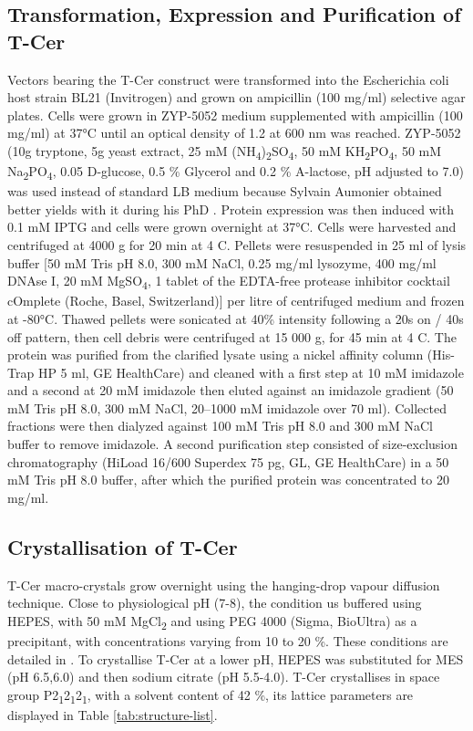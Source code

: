 \subsection{Transformation, Expression and Purification of T-Cer}
Vectors bearing the T-Cer construct were transformed into the Escherichia coli host strain BL21 (Invitrogen) and grown on ampicillin (100 mg/ml) selective agar plates. Cells were grown in ZYP-5052 medium supplemented with ampicillin (100 mg/ml) at 37°C until an optical density of 1.2 at 600 nm was reached. ZYP-5052 (10g tryptone, 5g yeast extract, 25 mM (NH\textsubscript{4})\textsubscript{2}SO\textsubscript{4}, 50 mM KH\textsubscript{2}PO\textsubscript{4}, 50 mM Na\textsubscript{2}PO\textsubscript{4}, 0.05 D-glucose, 0.5 \% Glycerol and 0.2 \% A-lactose, pH adjusted to 7.0) was used instead of standard LB medium because Sylvain Aumonier obtained better yields with it during his PhD \parencite{aumonierTimeresolvedMonochromaticSynchrotron2019}. Protein expression was then induced with 0.1 mM IPTG and cells were grown overnight at 37°C. Cells were harvested and centrifuged at 4000 g for 20 min at 4 \degree C. Pellets were resuspended in 25 ml of lysis buffer [50 mM Tris pH 8.0, 300 mM NaCl, 0.25 mg/ml lysozyme, 400 mg/ml DNAse I, 20 mM MgSO\textsubscript{4}, 1 tablet of the EDTA-free protease inhibitor cocktail cOmplete (Roche, Basel, Switzerland)] per litre of centrifuged medium and frozen at -80°C. Thawed pellets were sonicated at 40\% intensity following a 20s on / 40s off pattern, then cell debris were centrifuged at 15 000 g, for 45 min at 4 \degree C. The protein was purified from the clarified lysate using a nickel affinity column (His-Trap HP 5 ml, GE HealthCare) and cleaned with a first step at 10 mM imidazole and a second at 20 mM imidazole then eluted against an imidazole gradient (50 mM Tris pH 8.0, 300 mM NaCl, 20–1000 mM imidazole over 70 ml). Collected fractions were then dialyzed against 100 mM Tris pH 8.0 and 300 mM NaCl buffer to remove imidazole. A second purification step consisted of size-exclusion chromatography (HiLoad 16/600 Superdex 75 pg, GL, GE HealthCare) in a 50 mM Tris pH 8.0 buffer, after which the purified protein was concentrated to 20 mg/ml.

\subsection{Crystallisation of T-Cer}\label{sec:mat_cryst}
T-Cer macro-crystals grow overnight using the hanging-drop vapour diffusion technique. Close to physiological pH (7-8), the condition us buffered using HEPES, with 50 mM MgCl\textsubscript{2} and using PEG 4000 (Sigma, BioUltra) as a precipitant, with concentrations varying from 10 to 20 \%. These conditions are detailed in \cite{lelimousinIntrinsicDynamicsECFP2009,aumonierTimeresolvedMonochromaticSynchrotron2019}. To crystallise T-Cer at a lower pH, HEPES was substituted for MES (pH 6.5,6.0) and then sodium citrate (pH 5.5-4.0).  T-Cer crystallises in space group P2\textsubscript{1}2\textsubscript{1}2\textsubscript{1}, with a solvent content of 42 \%, its lattice parameters are displayed in Table \ref{tab:structure-list}.

